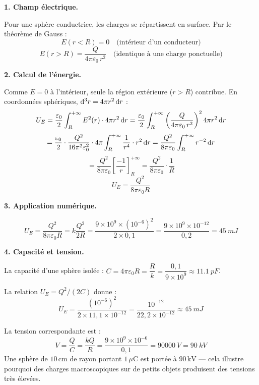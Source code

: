 \documentclass[12pt,a4paper]{article}
\begin{document}
\begin{boitecorrige}
\textbf{1. Champ électrique.}

Pour une sphère conductrice, les charges se répartissent en surface. Par le théorème de Gauss :
\[
E(r < R) = 0 \quad \text{(intérieur d'un conducteur)}
\]
\[
E(r > R) = \frac{Q}{4\pi\varepsilon_0\,r^2} \quad \text{(identique à une charge ponctuelle)}
\]

\textbf{2. Calcul de l'énergie.}

Comme $E = 0$ à l'intérieur, seule la région extérieure ($r > R$) contribue. En coordonnées sphériques, $\mathrm{d}^3r = 4\pi r^2\,\mathrm{d} r$ :
\[
U_E = \frac{\varepsilon_0}{2}\int_R^{+\infty} E^2(r)\cdot 4\pi r^2\,\mathrm{d} r = \frac{\varepsilon_0}{2}\int_R^{+\infty} \left(\frac{Q}{4\pi\varepsilon_0\,r^2}\right)^2 4\pi r^2\,\mathrm{d} r
\]
\[
= \frac{\varepsilon_0}{2}\cdot\frac{Q^2}{16\pi^2\varepsilon_0^2}\cdot 4\pi\int_R^{+\infty} \frac{1}{r^4}\cdot r^2\,\mathrm{d} r = \frac{Q^2}{8\pi\varepsilon_0}\int_R^{+\infty} r^{-2}\,\mathrm{d} r
\]
\[
= \frac{Q^2}{8\pi\varepsilon_0}\left[\frac{-1}{r}\right]_R^{+\infty} = \frac{Q^2}{8\pi\varepsilon_0}\cdot\frac{1}{R}
\]
\[
\boxed{U_E = \frac{Q^2}{8\pi\varepsilon_0 R}}
\]

\textbf{3. Application numérique.}

\[
U_E = \frac{Q^2}{8\pi\varepsilon_0 R} = k\frac{Q^2}{2R} = \frac{9\times10^9\times(10^{-6})^2}{2\times0{,}1} = \frac{9\times10^9\times10^{-12}}{0{,}2} = \qty{45}{mJ}
\]

\textbf{4. Capacité et tension.}

La capacité d'une sphère isolée : $C = 4\pi\varepsilon_0 R = \dfrac{R}{k} = \dfrac{0{,}1}{9\times10^9} \approx \qty{11.1}{pF}$.

La relation $U_E = Q^2/(2C)$ donne :
\[
U_E = \frac{(10^{-6})^2}{2\times11{,}1\times10^{-12}} = \frac{10^{-12}}{22{,}2\times10^{-12}} \approx \qty{45}{mJ}
\]

La tension correspondante est :
\[
V = \frac{Q}{C} = \frac{kQ}{R} = \frac{9\times10^9\times10^{-6}}{0{,}1} = \qty{90000}{V} = \qty{90}{kV}
\]
Une sphère de $10\,\text{cm}$ de rayon portant $1\,\mu\text{C}$ est portée à $90\,\text{kV}$ --- cela illustre pourquoi des charges macroscopiques sur de petits objets produisent des tensions très élevées.
\end{boitecorrige}

\ifdefined\inMainDoc\else
\end{document}
